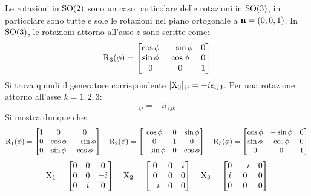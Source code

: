 Le rotazioni in $ \mathrm{SO}(2) $ sono un caso particolare delle rotazioni in $ \mathrm{SO}(3) $, in particolare sono tutte e sole le rotazioni nel piano ortogonale a $ \mathbf{n} = (0,0,1) $. In $ \mathrm{SO}(3) $, le rotazioni attorno all'asse $ z $ sono scritte come:
\begin{equation*}
	\mathrm{R}_3(\phi) =
	\begin{bmatrix}
		\cos \phi & -\sin \phi & 0 \\
		\sin \phi & \cos \phi & 0 \\
		0 & 0 & 1
	\end{bmatrix}
\end{equation*}
Si trova quindi il generatore corrispondente $ [\mathrm{X}_3]_{ij} = -i \epsilon_{ij3} $. Per una rotazione attorno all'asse $ k = 1,2,3 $:
\begin{equation}
	[\tens{X}_k]_{ij} = -i \epsilon_{ijk}
	\label{eq:9.10}
\end{equation}
Si mostra dunque che:
\begin{equation*}
	\mathrm{R}_1(\phi) =
	\begin{bmatrix}
		1 & 0 & 0 \\
		0 & \cos \phi & -\sin \phi \\
		0 & \sin \phi & \cos \phi
	\end{bmatrix}
	\quad
	\mathrm{R}_2(\phi) =
	\begin{bmatrix}
		\cos \phi & 0 & \sin \phi \\
		0 & 1 & 0 \\
		-\sin \phi & 0 & \cos \phi
	\end{bmatrix}
	\quad
	\mathrm{R}_3(\phi) =
	\begin{bmatrix}
		\cos \phi & -\sin \phi & 0 \\
		\sin \phi & \cos \phi & 0 \\
		0 & 0 & 1
	\end{bmatrix}
\end{equation*}
\begin{equation*}
	\mathrm{X}_1 =
	\begin{bmatrix}
		0 & 0 & 0 \\
		0 & 0 & -i \\
		0 & i & 0
	\end{bmatrix}
	\quad
	\mathrm{X}_2 =
	\begin{bmatrix}
		0 & 0 & i \\
		0 & 0 & 0 \\
		-i & 0 & 0
	\end{bmatrix}
	\quad
	\mathrm{X}_3 =
	\begin{bmatrix}
		0 & -i & 0 \\
		i & 0 & 0 \\
		0 & 0 & 0
	\end{bmatrix}
\end{equation*}
